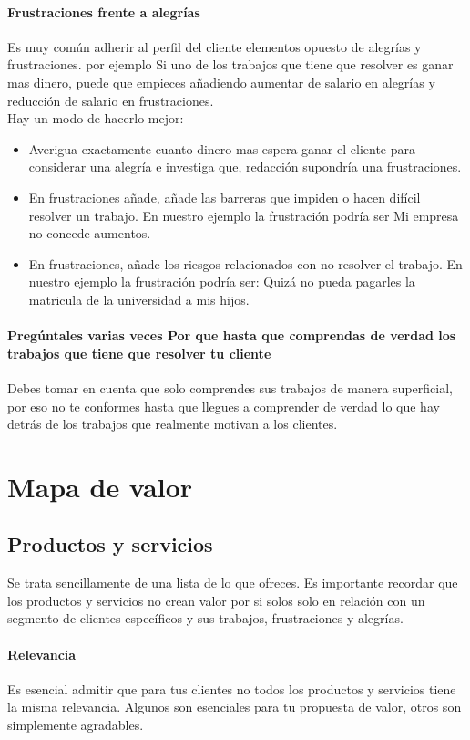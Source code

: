 \documentclass[11pt]{book}
\begin{document}
\paragraph{Frustraciones frente a alegrías}
Es muy común adherir al perfil del cliente elementos opuesto de alegrías y frustraciones. por ejemplo Si uno de los trabajos que tiene que resolver es ganar mas dinero, puede que empieces añadiendo aumentar de salario en alegrías y reducción de salario en frustraciones.\\
 Hay un modo de hacerlo mejor:
\begin{itemize}
\item Averigua exactamente cuanto dinero mas espera ganar el cliente para considerar una alegría e investiga que, redacción supondría una frustraciones.
\item En frustraciones añade, añade las barreras que impiden o hacen difícil resolver un trabajo. En nuestro ejemplo la frustración podría ser Mi empresa no concede aumentos.
\item En frustraciones, añade los riesgos relacionados con no resolver el trabajo. En nuestro ejemplo la frustración podría ser: Quizá no pueda pagarles la matricula de la universidad a mis hijos.
\end{itemize}
\paragraph{Pregúntales varias veces Por que hasta que comprendas de verdad los trabajos que tiene que resolver tu cliente}
Debes tomar en cuenta que solo comprendes sus trabajos de manera superficial, por eso no te conformes hasta que llegues a comprender de verdad lo que hay detrás de los trabajos que realmente motivan a los clientes.
\section{Mapa de valor}
\subsection{Productos y servicios}
Se trata sencillamente de una lista de lo que ofreces. Es importante recordar que los productos y servicios no crean valor por si solos solo en relación con un segmento de clientes específicos y sus trabajos, frustraciones y alegrías.
\paragraph{Relevancia}
Es esencial admitir que para tus clientes no todos los productos y servicios tiene la misma relevancia. Algunos son esenciales para tu propuesta de valor, otros son simplemente agradables.
\end{document}
